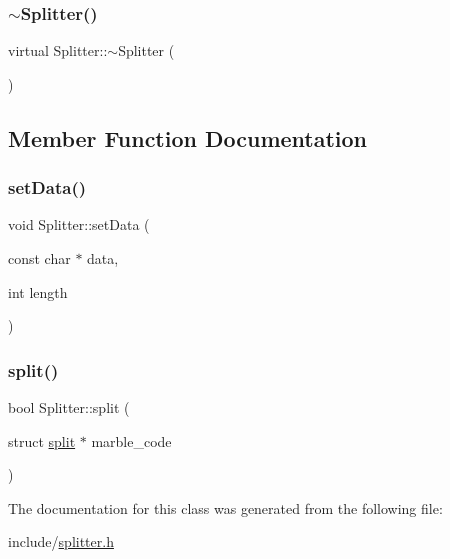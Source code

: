 \subsubsection{\texorpdfstring{$\sim$\+Splitter()}{~Splitter()}}
{\footnotesize\ttfamily virtual Splitter\+::$\sim$\+Splitter (\begin{DoxyParamCaption}{ }\end{DoxyParamCaption})\hspace{0.3cm}{\ttfamily [virtual]}}



\subsection{Member Function Documentation}
\mbox{\label{classSplitter_a63334af48b3c284b4852af96085a949f}} 
\subsubsection{\texorpdfstring{set\+Data()}{setData()}}
{\footnotesize\ttfamily void Splitter\+::set\+Data (\begin{DoxyParamCaption}\item[{const char $\ast$}]{data,  }\item[{int}]{length }\end{DoxyParamCaption})}

\mbox{\label{classSplitter_aec64e7219fdb1aaf94dfcf6b40a03efa}} 
\subsubsection{\texorpdfstring{split()}{split()}}
{\footnotesize\ttfamily bool Splitter\+::split (\begin{DoxyParamCaption}\item[{struct \hyperlink{structsplit}{split} $\ast$}]{marble\+\_\+code }\end{DoxyParamCaption})}



The documentation for this class was generated from the following file\+:\begin{DoxyCompactItemize}
\item 
include/\hyperlink{splitter_8h}{splitter.\+h}\end{DoxyCompactItemize}
